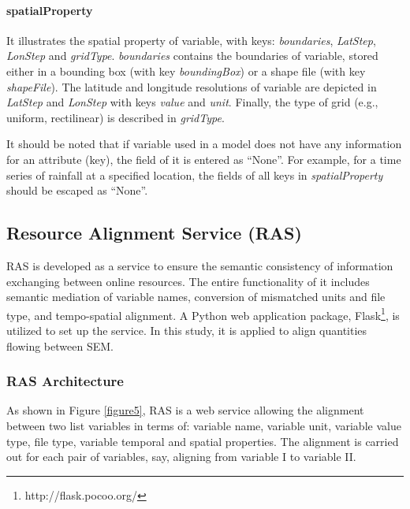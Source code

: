 \documentclass[review]{elsarticle}
\begin{document}
\paragraph{spatialProperty} It illustrates the spatial property of variable, with keys: \textit{boundaries}, \textit{LatStep}, \textit{LonStep} and \textit{gridType}. \textit{boundaries} contains the boundaries of variable, stored either in a bounding box (with key \textit{boundingBox}) or a shape file (with key \textit{shapeFile}). The latitude and longitude resolutions of variable are depicted in \textit{LatStep} and \textit{LonStep} with keys \textit{value} and \textit{unit}. Finally, the type of grid (e.g., uniform, rectilinear) is described in \textit{gridType}.

It should be noted that if variable used in a model does not have any information for an attribute (key), the field of it is entered as “None”. For example, for a time series of rainfall at a specified location, the fields of all keys in \textit{spatialProperty} should be escaped as “None”.

\subsection{Resource Alignment Service (RAS)} RAS is developed as a service to ensure the semantic consistency of information exchanging between online resources. The entire functionality of it includes semantic mediation of variable names, conversion of mismatched units and file type, and tempo-spatial alignment. A Python web application package, Flask\footnote{http://flask.pocoo.org/}, is utilized to set up the service. In this study, it is applied to align quantities flowing between SEM.

\subsubsection{RAS Architecture}As shown in Figure \ref{figure5}, RAS is a web service allowing the alignment between two list variables in terms of: variable name, variable unit, variable value type, file type, variable temporal and spatial properties. The alignment is carried out for each pair of variables, say, aligning from variable I to variable II.
\end{document}
